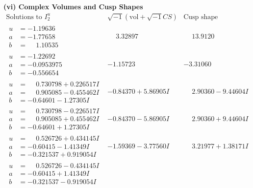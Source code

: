 \documentclass[1p]{elsarticle_modified}
\theoremstyle{definition}
\newcommand{\I}{\sqrt{-1}}
\begin{document}
\newpage\flushleft \textbf{(vi) Complex Volumes and Cusp Shapes}
$$\begin{array}{c|c|c}  
\text{Solutions to }I^u_{2}& \I (\text{vol} + \sqrt{-1}CS) & \text{Cusp shape}\\
 \hline 
\begin{aligned}
u &= -1.19636\phantom{ +0.000000I} \\
a &= -1.77658\phantom{ +0.000000I} \\
b &= \phantom{-}1.10535\phantom{ +0.000000I}\end{aligned}
 & \phantom{-}3.32897\phantom{ +0.000000I} & \phantom{-}13.9120\phantom{ +0.000000I} \\ \hline\begin{aligned}
u &= -1.22692\phantom{ +0.000000I} \\
a &= -0.0953975\phantom{ +0.000000I} \\
b &= -0.556654\phantom{ +0.000000I}\end{aligned}
 & -1.15723\phantom{ +0.000000I} & -3.31060\phantom{ +0.000000I} \\ \hline\begin{aligned}
u &= \phantom{-}0.730798 + 0.226517 I \\
a &= \phantom{-}0.905085 - 0.455462 I \\
b &= -0.64601 - 1.27305 I\end{aligned}
 & -0.84370 + 5.86905 I & \phantom{-}2.90360 - 9.44604 I \\ \hline\begin{aligned}
u &= \phantom{-}0.730798 - 0.226517 I \\
a &= \phantom{-}0.905085 + 0.455462 I \\
b &= -0.64601 + 1.27305 I\end{aligned}
 & -0.84370 - 5.86905 I & \phantom{-}2.90360 + 9.44604 I \\ \hline\begin{aligned}
u &= \phantom{-}0.526726 + 0.434145 I \\
a &= -0.60415 - 1.41349 I \\
b &= -0.321537 + 0.919054 I\end{aligned}
 & -1.59369 - 3.77560 I & \phantom{-}3.21977 + 1.38171 I \\ \hline\begin{aligned}
u &= \phantom{-}0.526726 - 0.434145 I \\
a &= -0.60415 + 1.41349 I \\
b &= -0.321537 - 0.919054 I\end{aligned}

\end{array}$$
\end{document}
